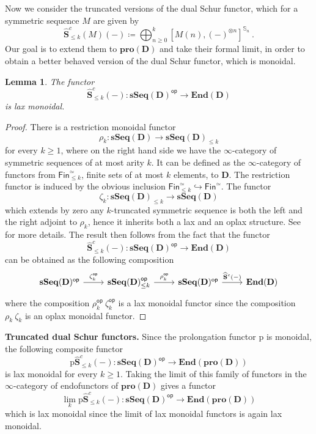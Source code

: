 \documentclass[a4paper,12pt]{amsart}
\theoremstyle{plain}
\newtheorem{lemma}[theorem]{Lemma}%
\theoremstyle{definition}
\theoremstyle{remark}
\begin{document}
Now we consider the truncated versions of the dual Schur functor, which for a symmetric sequence $M$ are given by 
\[
\widehat{\mathbf{S}}^c_{\leq k}(M)(-) \coloneqq \displaystyle \bigoplus_{n \geq 0}^{k} \left[M(n),(-)^{\otimes n} \right]^{\mathbb{S}_n}~. 
\]
Our goal is to extend them to $\mathbf{pro}(\mathbf{D})$ and take their formal limit, in order to obtain a better behaved version of the dual Schur functor, which is monoidal. 

\begin{lemma}
The functor 
\[
\widehat{\mathbf{S}}^c_{\leq k}(-): \mathbf{sSeq}(\mathbf{D})^{\mathsf{op}} \longrightarrow \mathbf{End}(\mathbf{D})
\]
is lax monoidal.
\end{lemma}

\begin{proof}
There is a restriction monoidal functor 
\[
\rho_k: \mathbf{sSeq}(\mathbf{D}) \longrightarrow \mathbf{sSeq}(\mathbf{D})_{\leq k}
\]
for every $k \geq 1$, where on the right hand side we have the $\infty$-category of symmetric sequences of at most arity $k$. It can be defined as the $\infty$-category of functors from $\mathsf{Fin}^{\simeq}_{\leq k}$, finite sets of at most $k$ elements, to $\mathbf{D}$. The restriction functor is induced by the obvious inclusion $\mathsf{Fin}^{\simeq}_{\leq k} \hookrightarrow \mathsf{Fin}^{\simeq}$. The functor 
\[
\zeta_k: \mathbf{sSeq}(\mathbf{D})_{\leq k} \longrightarrow \mathbf{sSeq}(\mathbf{D})
\]
which extends by zero any $k$-truncated symmetric sequence is both the left and the right adjoint to $\rho_k$, hence it inherits both a lax and an oplax structure. See \cite[Section 4]{heuts2024} for more details. The result then follows from the fact that the functor 
\[
\widehat{\mathbf{S}}^c_{\leq k}(-): \mathbf{sSeq}(\mathbf{D})^{\mathsf{op}} \longrightarrow \mathbf{End}(\mathbf{D})
\]
can be obtained as the following composition 
\[
\begin{tikzcd}
\mathbf{sSeq}(\mathbf{D})^{\mathsf{op}} \arrow[r,"\zeta_k^\mathsf{op}"]
&\mathbf{sSeq}(\mathbf{D})_{\leq k}^{\mathsf{op}} \arrow[r,"\rho_k^\mathsf{op}"]
&\mathbf{sSeq}(\mathbf{D})^{\mathsf{op}} \arrow[r,"\widehat{\mathbf{S}}^c(-)"]
&\mathbf{End}(\mathbf{D})
\end{tikzcd}
\]
where the composition $\rho_k^\mathsf{op}~\zeta_k^\mathsf{op}$ is a lax monoidal functor since the composition $ \rho_k ~ \zeta_k$ is an oplax monoidal functor. 
\end{proof}

\textbf{Truncated dual Schur functors.} Since the prolongation functor $\mathrm{p}$ is monoidal, the following composite functor 
\[
\mathrm{p}\widehat{\mathbf{S}}^c_{\leq k}(-): \mathbf{sSeq}(\mathbf{D})^{\mathsf{op}} \longrightarrow \mathbf{End}(\mathbf{pro}(\mathbf{D}))
\]
is lax monoidal for every $k \geq 1$. Taking the limit of this family of functors in the $\infty$-category of endofunctors of $\mathbf{pro}(\mathbf{D})$ gives a functor 
\[
\lim_k \mathrm{p}\widehat{\mathbf{S}}^c_{\leq k}(-): \mathbf{sSeq}(\mathbf{D})^{\mathsf{op}} \longrightarrow \mathbf{End}(\mathbf{pro}(\mathbf{D}))
\]
which is lax monoidal since the limit of lax monoidal functors is again lax monoidal.
\end{document}
